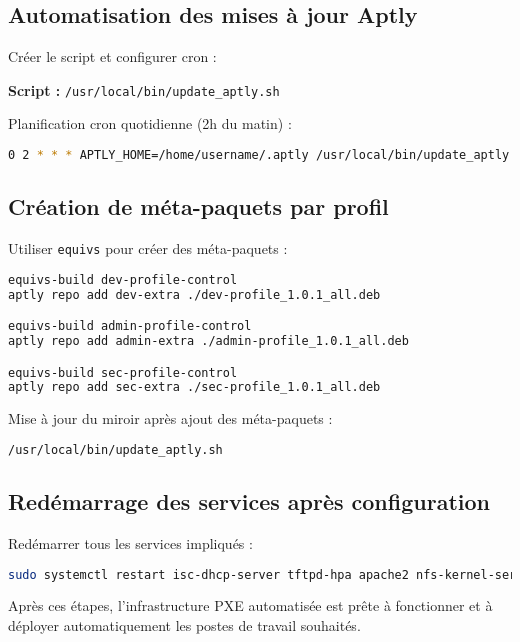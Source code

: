 \documentclass[a4paper,12pt]{article}
\begin{document}
\subsection{Automatisation des mises à jour Aptly}

Créer le script et configurer cron :

\textbf{Script :} \texttt{/usr/local/bin/update\_aptly.sh}

Planification cron quotidienne (2h du matin) :

\begin{lstlisting}[language=bash]
0 2 * * * APTLY_HOME=/home/username/.aptly /usr/local/bin/update_aptly.sh >> /var/log/aptly-update.log 2>&1
\end{lstlisting}

\subsection{Création de méta-paquets par profil}

Utiliser \texttt{equivs} pour créer des méta-paquets :

\begin{lstlisting}[language=bash]
equivs-build dev-profile-control
aptly repo add dev-extra ./dev-profile_1.0.1_all.deb

equivs-build admin-profile-control
aptly repo add admin-extra ./admin-profile_1.0.1_all.deb

equivs-build sec-profile-control
aptly repo add sec-extra ./sec-profile_1.0.1_all.deb
\end{lstlisting}

Mise à jour du miroir après ajout des méta-paquets :

\begin{lstlisting}[language=bash]
/usr/local/bin/update_aptly.sh
\end{lstlisting}

\subsection{Redémarrage des services après configuration}

Redémarrer tous les services impliqués :

\begin{lstlisting}[language=bash]
sudo systemctl restart isc-dhcp-server tftpd-hpa apache2 nfs-kernel-server
\end{lstlisting}

Après ces étapes, l’infrastructure PXE automatisée est prête à fonctionner et à déployer automatiquement les postes de travail souhaités.
\end{document}
